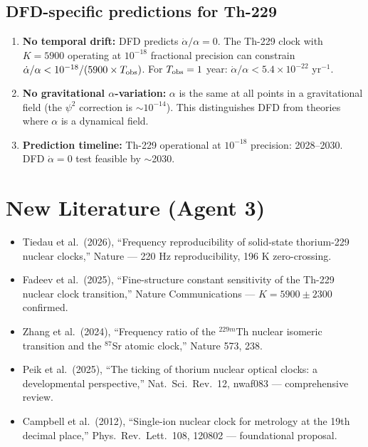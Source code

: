 \documentclass[11pt,a4paper]{article}
\begin{document}
\subsection{DFD-specific predictions for Th-229}

\begin{enumerate}
\item \textbf{No temporal drift:} DFD predicts $\dot{\alpha}/\alpha = 0$. The Th-229 clock with $K = 5900$ operating at $10^{-18}$ fractional precision can constrain $\dot{\alpha}/\alpha < 10^{-18}/(5900 \times T_{\rm obs})$. For $T_{\rm obs} = 1$ year: $\dot{\alpha}/\alpha < 5.4 \times 10^{-22}$ yr$^{-1}$.

\item \textbf{No gravitational $\alpha$-variation:} $\alpha$ is the same at all points in a gravitational field (the $\psi^2$ correction is $\sim 10^{-14}$). This distinguishes DFD from theories where $\alpha$ is a dynamical field.

\item \textbf{Prediction timeline:} Th-229 operational at $10^{-18}$ precision: 2028--2030. DFD $\dot{\alpha} = 0$ test feasible by $\sim$2030.
\end{enumerate}

\section{New Literature (Agent 3)}

\begin{itemize}
\item Tiedau et al.\ (2026), ``Frequency reproducibility of solid-state thorium-229 nuclear clocks,'' Nature --- 220 Hz reproducibility, 196 K zero-crossing.
\item Fadeev et al.\ (2025), ``Fine-structure constant sensitivity of the Th-229 nuclear clock transition,'' Nature Communications --- $K = 5900 \pm 2300$ confirmed.
\item Zhang et al.\ (2024), ``Frequency ratio of the $^{229m}$Th nuclear isomeric transition and the $^{87}$Sr atomic clock,'' Nature 573, 238.
\item Peik et al.\ (2025), ``The ticking of thorium nuclear optical clocks: a developmental perspective,'' Nat.\ Sci.\ Rev.\ 12, nwaf083 --- comprehensive review.
\item Campbell et al.\ (2012), ``Single-ion nuclear clock for metrology at the 19th decimal place,'' Phys.\ Rev.\ Lett.\ 108, 120802 --- foundational proposal.
\end{itemize}
\end{document}
